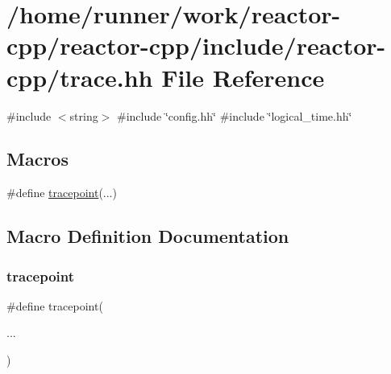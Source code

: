 \hypertarget{trace_8hh}{}\section{/home/runner/work/reactor-\/cpp/reactor-\/cpp/include/reactor-\/cpp/trace.hh File Reference}
\label{trace_8hh}
{\ttfamily \#include $<$string$>$}\newline
{\ttfamily \#include \char`\"{}config.\+hh\char`\"{}}\newline
{\ttfamily \#include \char`\"{}logical\+\_\+time.\+hh\char`\"{}}\newline
\subsection*{Macros}
\begin{DoxyCompactItemize}
\item 
\#define \hyperlink{trace_8hh_aeae0efb071b08e657d36788eee20c1a7}{tracepoint}(...)
\end{DoxyCompactItemize}


\subsection{Macro Definition Documentation}
\mbox{\label{trace_8hh_aeae0efb071b08e657d36788eee20c1a7}} 
\subsubsection{\texorpdfstring{tracepoint}{tracepoint}}
{\footnotesize\ttfamily \#define tracepoint(\begin{DoxyParamCaption}\item[{}]{... }\end{DoxyParamCaption})}

